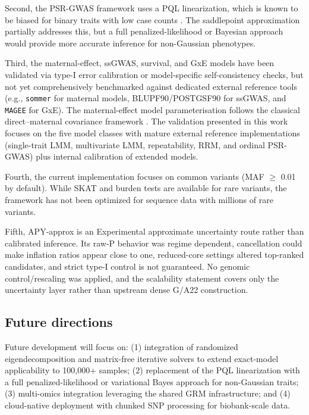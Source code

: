 \documentclass[11pt,a4paper]{article}
\begin{document}
Second, the PSR-GWAS framework uses a PQL linearization, which is known to be biased for binary traits with low case counts \citep{zhou2018saige}. The saddlepoint approximation partially addresses this, but a full penalized-likelihood or Bayesian approach would provide more accurate inference for non-Gaussian phenotypes.

Third, the maternal-effect, ssGWAS, survival, and GxE models have been validated via type-I error calibration or model-specific self-consistency checks, but not yet comprehensively benchmarked against dedicated external reference tools (e.g., \texttt{sommer} \citep{meyer1991,henderson1984} for maternal models, BLUPF90/POSTGSF90 for ssGWAS, and \texttt{MAGEE} \citep{tang2020} for GxE). The maternal-effect model parameterisation follows the classical direct--maternal covariance framework \citep{ragsdale2019,hayes2019}. The validation presented in this work focuses on the five model classes with mature external reference implementations (single-trait LMM, multivariate LMM, repeatability, RRM, and ordinal PSR-GWAS) plus internal calibration of extended models.

Fourth, the current implementation focuses on common variants (MAF $\geq$ 0.01 by default). While SKAT and burden tests are available for rare variants, the framework has not been optimized for sequence data with millions of rare variants.

Fifth, APY-approx is an Experimental approximate uncertainty route rather than calibrated inference. Its raw-P behavior was regime dependent, cancellation could make inflation ratios appear close to one, reduced-core settings altered top-ranked candidates, and strict type-I control is not guaranteed. No genomic control/rescaling was applied, and the scalability statement covers only the uncertainty layer rather than upstream dense G/A22 construction.

\subsection{Future directions}

Future development will focus on: (1) integration of randomized eigendecomposition and matrix-free iterative solvers to extend exact-model applicability to 100,000+ samples; (2) replacement of the PQL linearization with a full penalized-likelihood or variational Bayes approach for non-Gaussian traits; (3) multi-omics integration leveraging the shared GRM infrastructure; and (4) cloud-native deployment with chunked SNP processing for biobank-scale data.
\end{document}
